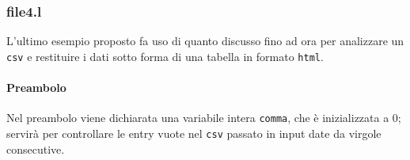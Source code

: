 \documentclass[class=book, crop=false, oneside, 12pt]{standalone}
\begin{document}
\subsubsection{file4.l} 



L'ultimo esempio proposto fa uso di quanto discusso fino ad ora per analizzare un \texttt{csv} e restituire i dati sotto forma di una tabella in formato \texttt{html}.

\paragraph{Preambolo}
Nel preambolo viene dichiarata una variabile intera \texttt{comma}, che è inizializzata a \(0\); servirà per controllare le entry vuote nel \texttt{csv} passato in input date da virgole consecutive.
\end{document}
